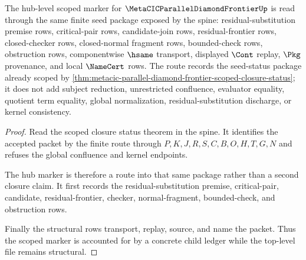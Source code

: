\begin{theorem}
\label{thm:metacic-parallel-diamond-frontier-scoped-seed-package-route}
The hub-level scoped marker for $\MetaCICParallelDiamondFrontierUp$ is read through the same finite seed package exposed by the spine: residual-substitution premise rows, critical-pair rows, candidate-join rows, residual-frontier rows, closed-checker rows, closed-normal fragment rows, bounded-check rows, obstruction rows, componentwise $\hsame$ transport, displayed $\Cont$ replay, $\Pkg$ provenance, and local $\NameCert$ rows. The route records the seed-status package already scoped by \autoref{thm:metacic-parallel-diamond-frontier-scoped-closure-status}; it does not add subject reduction, unrestricted confluence, evaluator equality, quotient term equality, global normalization, residual-substitution discharge, or kernel consistency.
\end{theorem}
\begin{proof}
Read the scoped closure status theorem in the spine. It identifies the accepted packet by the finite route through $P,K,J,R,S,C,B,O,H,T,G,N$ and refuses the global confluence and kernel endpoints.

The hub marker is therefore a route into that same package rather than a second closure claim. It first records the residual-substitution premise, critical-pair, candidate, residual-frontier, checker, normal-fragment, bounded-check, and obstruction rows.

Finally the structural rows transport, replay, source, and name the packet. Thus the scoped marker is accounted for by a concrete child ledger while the top-level file remains structural.
\end{proof}
